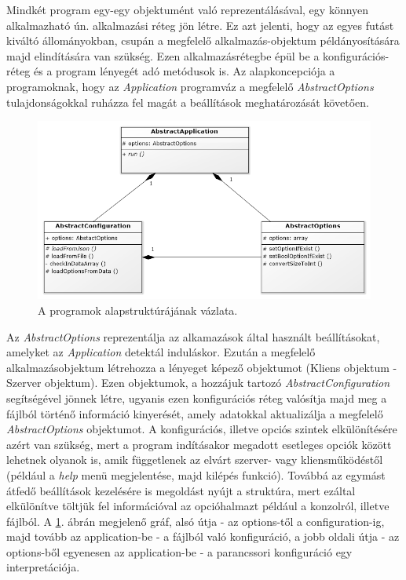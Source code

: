 \documentclass[12pt]{report}
\begin{document}
Mindkét program egy-egy objektumént való reprezentálásával, egy könnyen alkalmazható ún. alkalmazási réteg jön létre. Ez azt jelenti, hogy az egyes futást kiváltó állományokban, csupán a megfelelő alkalmazás-objektum példányosítására majd elindítására van szükség.
Ezen alkalmazásrétegbe épül be a konfigurációs-réteg és a program lényegét adó metódusok is. 
Az alapkoncepciója a programoknak, hogy az \textit{Application} programváz a megfelelő \textit{AbstractOptions} tulajdonságokkal ruházza fel magát a beállítások meghatározását követően.
     \begin{figure}[ht]
  \centering
    \includegraphics[width=15cm]{pics/abstracts.png}
	  \caption{A programok alapstruktúrájának vázlata.}
      \label{fig:abstract}
  \end{figure}
Az \textit{AbstractOptions} reprezentálja az alkamazások által használt beállításokat, amelyket az \textit{Application} detektál induláskor. Ezután a megfelelő alkalmazásobjektum létrehozza a lényeget képező objektumot (Kliens objektum - Szerver objektum). Ezen objektumok, a hozzájuk tartozó \textit{AbstractConfiguration} segítségével jönnek létre, ugyanis ezen konfigurációs réteg valósítja majd meg a fájlból történő információ kinyerését, amely adatokkal aktualizálja a megfelelő \textit{AbstractOptions} objektumot.
A konfigurációs, illetve opciós szintek elkülönítésére azért van szükség, mert a program indításakor megadott esetleges opciók között lehetnek olyanok is, amik függetlenek az elvárt szerver- vagy kliensműködéstől (például a \textit{help} menü megjelentése, majd kilépés funkció). Továbbá az egymást átfedő beállítások kezelésére is megoldást nyújt a struktúra, mert ezáltal elkülönítve töltjük fel információval az opcióhalmazt például a konzolról, illetve fájlból.
A \ref{fig:abstract}. ábrán megjelenő gráf, alsó útja - az options-től a configuration-ig, majd tovább az application-be - a fájlból való konfiguráció, a jobb oldali útja - az options-ből egyenesen az application-be - a parancssori konfiguráció egy interpretációja.
\end{document}
